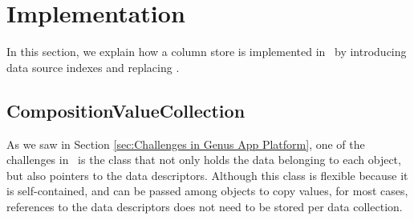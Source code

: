 \section{Implementation}
\label{sec:Implementation}
In this section, we explain how a column store is implemented in \gap~by introducing data source indexes and replacing .

\subsection{CompositionValueCollection}
\label{sub:CompositionValueCollection}
As we saw in Section \ref{sec:Challenges in Genus App Platform}, one of the challenges in \gap~is the  class that not only holds the data belonging to each object, but also pointers to the data descriptors. Although this class is flexible because it is self-contained, and can be passed among objects to copy values, for most cases, references to the data descriptors does not need to be stored per data collection. 

